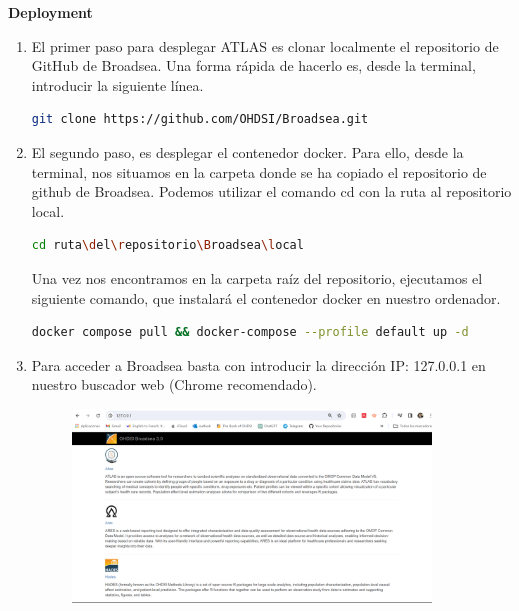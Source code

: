 \documentclass{article}
\begin{document}
\textbf{Deployment}
\begin{enumerate}
    \item El primer paso para desplegar ATLAS es clonar localmente el repositorio de GitHub de Broadsea. Una forma rápida de hacerlo es, desde la terminal, introducir la siguiente línea.

\begin{lstlisting}[language=sh]
        git clone https://github.com/OHDSI/Broadsea.git
\end{lstlisting}

    \item El segundo paso, es desplegar el contenedor docker. Para ello, desde la terminal, nos situamos en la carpeta donde se ha copiado el repositorio de github de Broadsea. Podemos utilizar el comando cd con la ruta al repositorio local.

\begin{lstlisting}[language=sh]
        cd ruta\del\repositorio\Broadsea\local
\end{lstlisting}

    Una vez nos encontramos en la carpeta raíz del repositorio, ejecutamos el siguiente comando, que instalará el contenedor docker en nuestro ordenador.

\begin{lstlisting}[language=sh]
    docker compose pull && docker-compose --profile default up -d
\end{lstlisting}

    \item Para acceder a Broadsea basta con introducir la dirección IP: 127.0.0.1 en nuestro buscador web (Chrome recomendado).

\begin{figure}[H]
    \centering
    \includegraphics[width=0.90\textwidth]{images/broadseaCap.png}
\end{figure}


    



\end{enumerate}
\end{document}
